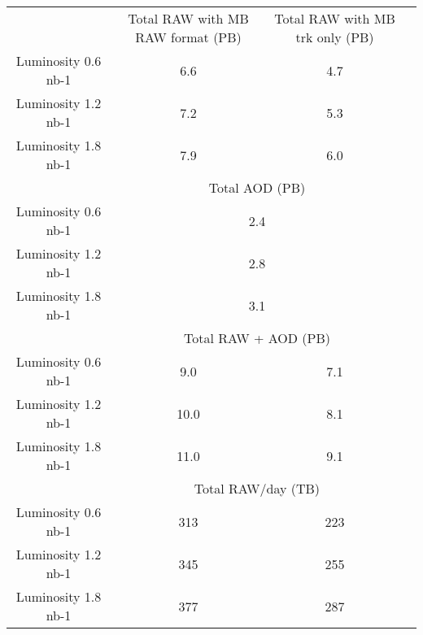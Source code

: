 \begin{center}
\begin{tabular}{ |c|c|c|c|} 




\hline
&  Total RAW with MB RAW format (PB) &  Total RAW with MB trk only (PB)\\
Luminosity 0.6 nb-1 & 6.6 & 4.7 \\
Luminosity 1.2 nb-1 & 7.2 & 5.3 \\ 
Luminosity 1.8 nb-1 & 7.9 & 6.0 \\                 
\hline
& \multicolumn{2}{c|}{Total AOD (PB)}\\
Luminosity 0.6 nb-1 & \multicolumn{2}{c|}{2.4} \\
Luminosity 1.2 nb-1 & \multicolumn{2}{c|}{2.8} \\ 
Luminosity 1.8 nb-1 & \multicolumn{2}{c|}{3.1} \\
\hline
&  \multicolumn{2}{c|}{Total RAW + AOD (PB)}\\
Luminosity 0.6 nb-1 & 9.0 & 7.1 \\
Luminosity 1.2 nb-1 & 10.0 & 8.1 \\ 
Luminosity 1.8 nb-1 & 11.0 & 9.1 \\   
\hline 
&  \multicolumn{2}{c|}{Total RAW/day (TB)}\\
Luminosity 0.6 nb-1 & 313 & 223 \\
Luminosity 1.2 nb-1 & 345 & 255 \\ 
Luminosity 1.8 nb-1 & 377 & 287 \\   
\hline 
\end{tabular}
\end{center}


